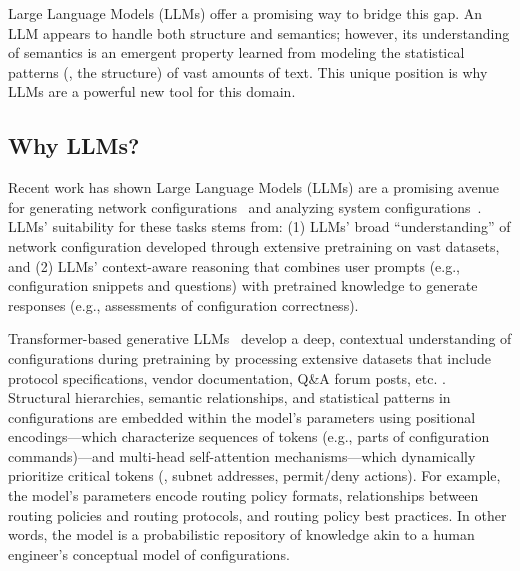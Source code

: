 Large Language Models (LLMs) offer a promising way to bridge this gap. An LLM appears to handle both structure and semantics; however, its understanding of semantics is an emergent property learned from modeling the statistical patterns (\eg, the structure) of vast amounts of text. This unique position is why LLMs are a powerful new tool for this domain.


\subsection{Why LLMs?}
\label{sec:motivation:llms}

Recent work has shown Large Language Models (LLMs) are a promising avenue for generating network configurations~\cite{wang2024netconfeval, bogdanov2024leveraging, mondal2023what, wang2023making, li2024preconfig} and analyzing system configurations~\cite{lian2023configuration, wang2024identifying}. LLMs' suitability for these tasks stems from: (1) LLMs' broad ``understanding'' of network configuration developed through extensive pretraining on vast datasets,
and (2) LLMs' context-aware reasoning that combines user prompts (e.g., configuration snippets and questions) with pretrained knowledge to generate responses (e.g., assessments of configuration correctness).

    
Transformer-based generative LLMs~\cite{vaswani2017attention,hill2024transformers,lin2022survey} 
 develop a deep, contextual understanding of configurations during pretraining by processing extensive datasets that include protocol specifications, vendor documentation, Q\&A forum posts, etc.
\cite{qiu2020pre,achiam2023gpt,touvron2023llama,brown2020language}. 
Structural hierarchies, semantic relationships, and statistical patterns in configurations are embedded within the model’s parameters using positional encodings---which characterize sequences of tokens (e.g., parts of configuration commands)---and multi-head self-attention mechanisms---which dynamically prioritize critical tokens (\eg, subnet addresses, permit/deny actions). For example, the model's parameters encode routing policy formats, relationships between routing policies and routing protocols, and routing policy best practices. In other words, the model is a probabilistic repository of knowledge akin to a human engineer's conceptual model of configurations.


